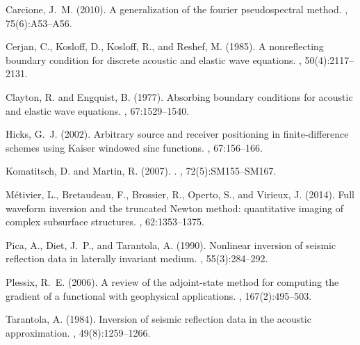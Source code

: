 
\newcommand{\SortNoop}[1]{}
\begin{thebibliography}{}

Carcione, J.~M. (2010).
\newblock A generalization of the fourier pseudospectral method.
, 75(6):A53--A56.

Cerjan, C., Kosloff, D., Kosloff, R., and Reshef, M. (1985).
\newblock A nonreflecting boundary condition for discrete acoustic and elastic
  wave equations.
, 50(4):2117--2131.

Clayton, R. and Engquist, B. (1977).
\newblock Absorbing boundary conditions for acoustic and elastic wave
  equations.
,
  67:1529--1540.

Hicks, G.~J. (2002).
\newblock Arbitrary source and receiver positioning in finite-difference
  schemes using {K}aiser windowed sinc functions.
, 67:156--166.

Komatitsch, D. and Martin, R. (2007).
.
, 72(5):SM155--SM167.

M\'etivier, L., Bretaudeau, F., Brossier, R., Operto, S., and Virieux, J.
  (2014).
\newblock Full waveform inversion and the truncated {N}ewton method:
  quantitative imaging of complex subsurface structures.
, 62:1353--1375.

Pica, A., Diet, J.~P., and Tarantola, A. (1990).
\newblock Nonlinear inversion of seismic reflection data in laterally invariant
  medium.
, 55(3):284--292.

Plessix, R.~E. (2006).
\newblock A review of the adjoint-state method for computing the gradient of a
  functional with geophysical applications.
, 167(2):495--503.

Tarantola, A. (1984).
\newblock Inversion of seismic reflection data in the acoustic approximation.
, 49(8):1259--1266.


\end{thebibliography}
